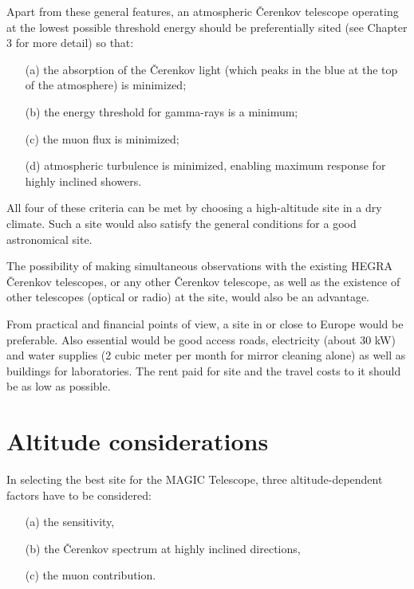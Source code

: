 Apart from these general features, an atmospheric \v{C}erenkov telescope
operating at the lowest possible threshold energy should be preferentially
sited (see Chapter 3 for more detail) so that:

\begin{itemize}
\item[(a)]  the absorption of the \v{C}erenkov light (which peaks in the blue at
the top of the atmosphere) is minimized;

\item[(b)]  the energy threshold for gamma-rays is a minimum;

\item[(c)]  the muon flux is minimized;

\item[(d)]  atmospheric turbulence is minimized, enabling maximum response
for highly inclined showers.
\end{itemize}

All four of these criteria can be met by choosing a high-altitude site in a
dry climate. Such a site would also satisfy the general conditions for a
good astronomical site.

The possibility of making simultaneous observations with the existing HEGRA
\v{C}erenkov telescopes, or any other \v{C}erenkov telescope, as well as the
existence of other telescopes (optical or radio) at the site, would also be
an advantage.

From practical and financial points of view, a site in or close to Europe
would be preferable. Also essential would be good access roads, electricity
(about 30 kW) and water supplies (2 cubic meter per month for mirror
cleaning alone) as well as buildings for laboratories. The rent paid for
site and the travel costs to it should be as low as possible.

\section{Altitude considerations}


\medskip In selecting the best site for the MAGIC Telescope, three altitude-dependent
factors have to be considered:

\begin{itemize}
\item[(a)]  the sensitivity,

\item[(b)]  the \v{C}erenkov spectrum at highly inclined directions,

\item[(c)]  the muon contribution.
\end{itemize}

